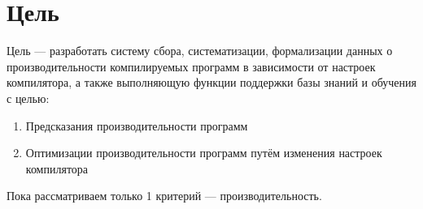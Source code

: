 \section{Цель}
Цель — разработать систему сбора, систематизации, формализации данных о производительности компилируемых программ в зависимости от настроек компилятора, а также выполняющую функции поддержки базы знаний и обучения с целью:
\begin{enumerate}
\item Предсказания производительности программ
\item Оптимизации производительности программ путём изменения настроек компилятора
\end{enumerate}

Пока рассматриваем только 1 критерий --- производительность.
